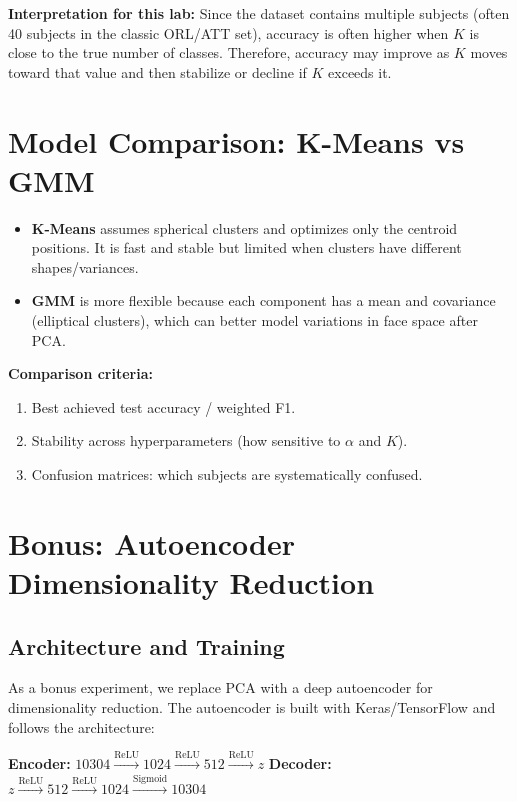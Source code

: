 \documentclass[11pt,a4paper]{article}
\begin{document}
\textbf{Interpretation for this lab:}
Since the dataset contains multiple subjects (often 40 subjects in the classic ORL/ATT set), accuracy is often higher when $K$ is close to the true number of classes. Therefore, accuracy may improve as $K$ moves toward that value and then stabilize or decline if $K$ exceeds it.

\section{Model Comparison: K-Means vs GMM}
\begin{itemize}
    \item \textbf{K-Means} assumes spherical clusters and optimizes only the centroid positions. It is fast and stable but limited when clusters have different shapes/variances.
    \item \textbf{GMM} is more flexible because each component has a mean and covariance (elliptical clusters), which can better model variations in face space after PCA.
\end{itemize}

\textbf{Comparison criteria:}
\begin{enumerate}
    \item Best achieved test accuracy / weighted F1.
    \item Stability across hyperparameters (how sensitive to $\alpha$ and $K$).
    \item Confusion matrices: which subjects are systematically confused.
\end{enumerate}

\section{Bonus: Autoencoder Dimensionality Reduction}

\subsection{Architecture and Training}

As a bonus experiment, we replace PCA with a deep autoencoder for dimensionality reduction.
The autoencoder is built with Keras/TensorFlow and follows the architecture:

\begin{center}
\textbf{Encoder:} $10304 \xrightarrow{\text{ReLU}} 1024 \xrightarrow{\text{ReLU}} 512 \xrightarrow{\text{ReLU}} z$
\quad
\textbf{Decoder:} $z \xrightarrow{\text{ReLU}} 512 \xrightarrow{\text{ReLU}} 1024 \xrightarrow{\text{Sigmoid}} 10304$
\end{center}
\end{document}

